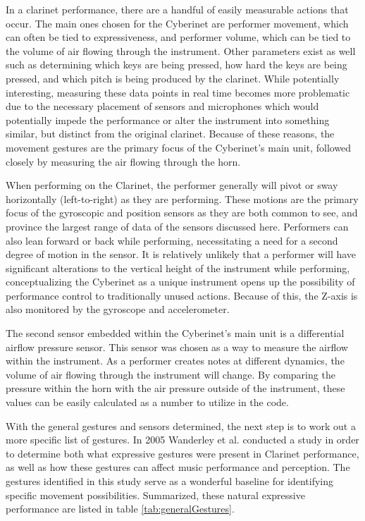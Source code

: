 In a clarinet performance, there are a handful of easily measurable actions that occur. The main ones chosen for the Cyberinet are performer movement, which can often be tied to expressiveness\cite{wanderleyClarinetGesture2005}, and performer volume, which can be tied to the volume of air flowing through the instrument. Other parameters exist as well such as determining which keys are being pressed, how hard the keys are being pressed, and which pitch is being produced by the clarinet. While potentially interesting, measuring these data points in real time becomes more problematic due to the necessary placement of sensors and microphones which would potentially impede the performance or alter the instrument into something similar, but distinct from the original clarinet. Because of these reasons, the movement gestures are the primary focus of the Cyberinet's main unit, followed closely by measuring the air flowing through the horn.

When performing on the Clarinet, the performer generally will pivot or sway horizontally (left-to-right) as they are performing. These motions are the primary focus of the gyroscopic and position sensors as they are both common to see, and province the largest range of data of the sensors discussed here. Performers can also lean forward or back while performing, necessitating a need for a second degree of motion in the sensor. It is relatively unlikely that a performer will have significant alterations to the vertical height of the instrument while performing, conceptualizing the Cyberinet as a unique instrument opens up the possibility of performance control to traditionally unused actions. Because of this, the Z-axis is also monitored by the gyroscope and accelerometer. 



The second sensor embedded within the Cyberinet's main unit is a differential airflow pressure sensor. This sensor was chosen as a way to measure the airflow within the instrument. As a performer creates notes at different dynamics, the volume of air flowing through the instrument will change. By comparing the pressure within the horn with the air pressure outside of the instrument, these values can be easily calculated as a number to utilize in the code.

With the general gestures and sensors determined, the next step is to work out a more specific list of gestures. In 2005 Wanderley et al. conducted a study in order to determine both what expressive gestures were present in Clarinet performance, as well as how these gestures can affect music performance and perception\cite{wanderleyClarinetGesture2005}. The gestures identified in this study serve as a wonderful baseline for identifying specific movement possibilities. Summarized, these natural expressive performance are listed in table \ref{tab:generalGestures}.

